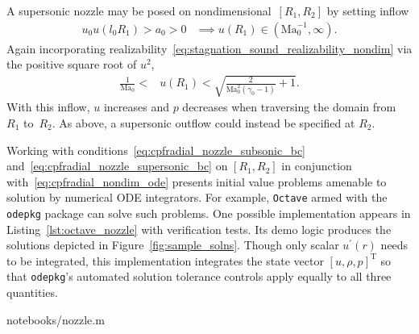 \documentclass[letterpaper,11pt,nointlimits,reqno]{amsart}
\newcommand{\Mach}[1][]{\mbox{Ma}_{#1}}
\begin{document}
A supersonic nozzle may be posed on nondimensional~$\left[R_{1}, R_{2}\right]$
by setting inflow
\begin{align}
   u_0 u\!\left(l_0 R_{1}\right) > a_0 > 0
   &\implies
   u\!\left(R_{1}\right) \in \left(\Mach[0]^{-1}, \infty\right)
.
\end{align}
Again incorporating
realizability~\eqref{eq:stagnation_sound_realizability_nondim} via the positive
square root of $u^2$,
\begin{align}
  \frac{1}{\Mach[0]} < &u\!\left(R_1\right)
  < \sqrt{\frac{2}{\Mach[0]^2\left(\gamma_0-1\right)}+1}
\label{eq:cpfradial_nozzle_supersonic_bc}
.
\end{align}
With this inflow, $u$ increases and $p$ decreases when traversing the domain
from~$R_{1}$ to~$R_{2}$.  As above, a supersonic outflow could instead be
specified at $R_{2}$.

Working with conditions~\eqref{eq:cpfradial_nozzle_subsonic_bc}
and~\eqref{eq:cpfradial_nozzle_supersonic_bc} on $\left[R_1, R_2\right]$ in
conjunction with~\eqref{eq:cpfradial_nondim_ode} presents initial value
problems amenable to solution by numerical ODE integrators.  For example,
\texttt{Octave}\citep{Eaton2008GNU} armed with the \texttt{odepkg} package can
solve such problems.  One possible implementation appears in
Listing~\ref{lst:octave_nozzle} with verification tests.  Its demo logic
produces the solutions depicted in Figure~\ref{fig:sample_solns}.  Though only
scalar $u^\prime\!\left(r\right)$ needs to be integrated, this implementation
integrates the state vector $\left[u, \rho, p\right]^\mathrm{T}$ so that
\texttt{odepkg}'s automated solution tolerance controls apply equally to all
three quantities.


                {notebooks/nozzle.m}
\end{document}
